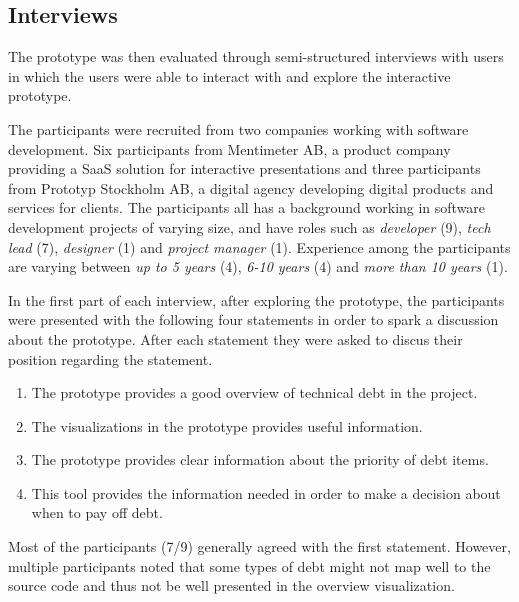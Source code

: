 \subsection{Interviews}

The prototype was then evaluated through semi-structured interviews with users in which the users were able to interact with and explore the interactive prototype.

The participants were recruited from two companies working with software development.
Six participants from Mentimeter AB, a product company providing a SaaS solution for interactive presentations and three participants from Prototyp Stockholm AB, a digital agency developing digital products and services for clients.
The participants all has a background working in software development projects of varying size, and have roles such as \textit{developer} (9), \textit{tech lead} (7), \textit{designer} (1) and \textit{project manager} (1).
Experience among the participants are varying between \textit{up to 5 years} (4), \textit{6-10 years} (4) and \textit{more than 10 years} (1).

In the first part of each interview, after exploring the prototype, the participants were presented with the following four statements in order to spark a discussion about the prototype.
After each statement they were asked to discus their position regarding the statement.

\smallskip
\begin{enumerate}
  \item The prototype provides a good overview of technical debt in the project.
  \item The visualizations in the prototype provides useful information.
  \item The prototype provides clear information about the priority of debt items.
  \item This tool provides the information needed in order to make a decision about when to pay off debt.
\end{enumerate}
\smallskip

Most of the participants (7/9) generally agreed with the first statement.
However, multiple participants noted that some types of debt might not map well to the source code and thus not be well presented in the overview visualization.


